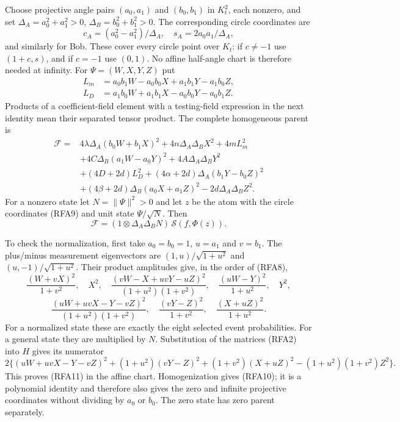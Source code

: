 Choose projective angle pairs $(a_0,a_1)$ and $(b_0,b_1)$ in $K_t^2$,
each nonzero, and set
$\Delta_A=a_0^2+a_1^2>0$, $\Delta_B=b_0^2+b_1^2>0$.
The corresponding circle coordinates are
\[
 c_A=(a_0^2-a_1^2)/\Delta_A,\quad s_A=2a_0a_1/\Delta_A,
 \tag{RFA9}
\]
and similarly for Bob. These cover every circle point over $K_t$:
if $c\ne-1$ use $(1+c,s)$, and if $c=-1$ use $(0,1)$.
No affine half-angle chart is therefore needed at infinity.
For $\Psi=(W,X,Y,Z)$ put
\[
 \begin{split}
 L_m&=a_0b_1W-a_0b_0X+a_1b_1Y-a_1b_0Z,\\
 L_D&=a_1b_0W+a_1b_1X-a_0b_0Y-a_0b_1Z.
 \end{split}
\]
Products of a coefficient-field element with a testing-field expression
in the next identity mean their separated tensor product. The complete
homogeneous parent is
\[
 \begin{split}
 \mathcal F={}&4\lambda\Delta_A(b_0W+b_1X)^2
       +4n\Delta_A\Delta_BX^2+4mL_m^2\\
 &+4C\Delta_B(a_1W-a_0Y)^2+4A\Delta_A\Delta_BY^2\\
 &+(4D+2d)L_D^2
       +(4\alpha+2d)\Delta_A(b_1Y-b_0Z)^2\\
 &+(4\beta+2d)\Delta_B(a_0X+a_1Z)^2
       -2d\Delta_A\Delta_BZ^2.
 \end{split}                                                    \tag{RFA10}
\]
For a nonzero state let $N=\|\Psi\|^2>0$ and let $z$ be the atom
with the circle coordinates (RFA9) and unit state $\Psi/\sqrt N$.
Then
\[
 \mathcal F=(1\otimes\Delta_A\Delta_BN)\,
                 \mathscr S(f,\Phi(z)).
 \tag{RFA11}
\]

To check the normalization, first take $a_0=b_0=1$, $u=a_1$ and
$v=b_1$. The plus/minus measurement eigenvectors are
$(1,u)/\sqrt{1+u^2}$ and $(u,-1)/\sqrt{1+u^2}$.
Their product amplitudes give, in the order of (RFA8),
\[
 \frac{(W+vX)^2}{1+v^2},\quad X^2,\quad
 \frac{(vW-X+uvY-uZ)^2}{(1+u^2)(1+v^2)},\quad
 \frac{(uW-Y)^2}{1+u^2},\quad Y^2,
\]
\[
 \frac{(uW+uvX-Y-vZ)^2}{(1+u^2)(1+v^2)},\quad
 \frac{(vY-Z)^2}{1+v^2},\quad
 \frac{(X+uZ)^2}{1+u^2}.
 \tag{RFA12}
\]
For a normalized state these are exactly the eight selected event
probabilities. For a general state they are multiplied by $N$.
Substitution of the matrices (RFA2) into $H$ gives its numerator
\[
 2\{(uW+uvX-Y-vZ)^2+(1+u^2)(vY-Z)^2
       +(1+v^2)(X+uZ)^2-(1+u^2)(1+v^2)Z^2\}.
\]
This proves (RFA11) in the affine chart. Homogenization gives (RFA10);
it is a polynomial identity and therefore also gives the zero and
infinite projective coordinates without dividing by $a_0$ or $b_0$.
The zero state has zero parent separately.


